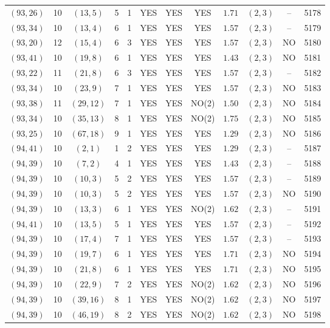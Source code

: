 \begin{longtable}{|c|c|c|c|c|c|c|c|c|c|c|c|}
$(93,26)$ & 10 & $(13,5)$ & 5 & 1 & YES & YES & YES & $1.71$ & $(2,3)$ & -- & 5178\\
$(93,34)$ & 10 & $(13,4)$ & 6 & 1 & YES & YES & YES & $1.57$ & $(2,3)$ & -- & 5179\\
$(93,20)$ & 12 & $(15,4)$ & 6 & 3 & YES & YES & YES & $1.57$ & $(2,3)$ & NO & 5180\\
$(93,41)$ & 10 & $(19,8)$ & 6 & 1 & YES & YES & YES & $1.43$ & $(2,3)$ & NO & 5181\\
$(93,22)$ & 11 & $(21,8)$ & 6 & 3 & YES & YES & YES & $1.57$ & $(2,3)$ & -- & 5182\\
$(93,34)$ & 10 & $(23,9)$ & 7 & 1 & YES & YES & YES & $1.57$ & $(2,3)$ & NO & 5183\\
$(93,38)$ & 11 & $(29,12)$ & 7 & 1 & YES & YES & NO(2) & $1.50$ & $(2,3)$ & NO & 5184\\
$(93,34)$ & 10 & $(35,13)$ & 8 & 1 & YES & YES & NO(2) & $1.75$ & $(2,3)$ & NO & 5185\\
$(93,25)$ & 10 & $(67,18)$ & 9 & 1 & YES & YES & YES & $1.29$ & $(2,3)$ & NO & 5186\\
$(94,41)$ & 10 & $(2,1)$ & 1 & 2 & YES & YES & YES & $1.29$ & $(2,3)$ & -- & 5187\\
$(94,39)$ & 10 & $(7,2)$ & 4 & 1 & YES & YES & YES & $1.43$ & $(2,3)$ & -- & 5188\\
$(94,39)$ & 10 & $(10,3)$ & 5 & 2 & YES & YES & YES & $1.57$ & $(2,3)$ & -- & 5189\\
$(94,39)$ & 10 & $(10,3)$ & 5 & 2 & YES & YES & YES & $1.57$ & $(2,3)$ & NO & 5190\\
$(94,39)$ & 10 & $(13,3)$ & 6 & 1 & YES & YES & NO(2) & $1.62$ & $(2,3)$ & -- & 5191\\
$(94,41)$ & 10 & $(13,5)$ & 5 & 1 & YES & YES & YES & $1.57$ & $(2,3)$ & -- & 5192\\
$(94,39)$ & 10 & $(17,4)$ & 7 & 1 & YES & YES & YES & $1.57$ & $(2,3)$ & -- & 5193\\
$(94,39)$ & 10 & $(19,7)$ & 6 & 1 & YES & YES & YES & $1.71$ & $(2,3)$ & NO & 5194\\
$(94,39)$ & 10 & $(21,8)$ & 6 & 1 & YES & YES & YES & $1.71$ & $(2,3)$ & NO & 5195\\
$(94,39)$ & 10 & $(22,9)$ & 7 & 2 & YES & YES & NO(2) & $1.62$ & $(2,3)$ & NO & 5196\\
$(94,39)$ & 10 & $(39,16)$ & 8 & 1 & YES & YES & NO(2) & $1.62$ & $(2,3)$ & NO & 5197\\
$(94,39)$ & 10 & $(46,19)$ & 8 & 2 & YES & YES & NO(2) & $1.62$ & $(2,3)$ & NO & 5198\\

\end{longtable}

